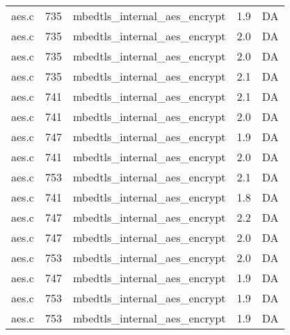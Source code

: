 \begin{table}[h!]
\begin{tabular}{lrlrr}
aes.c& 735&mbedtls\_internal\_aes\_encrypt&1.9 &DA\\
aes.c& 735&mbedtls\_internal\_aes\_encrypt&2.0 &DA\\
aes.c& 735&mbedtls\_internal\_aes\_encrypt&2.0 &DA\\
aes.c& 735&mbedtls\_internal\_aes\_encrypt&2.1 &DA\\
aes.c& 741&mbedtls\_internal\_aes\_encrypt&2.1 &DA\\
aes.c& 741&mbedtls\_internal\_aes\_encrypt&2.0 &DA\\
aes.c& 747&mbedtls\_internal\_aes\_encrypt&1.9 &DA\\
aes.c& 741&mbedtls\_internal\_aes\_encrypt&2.0 &DA\\
aes.c& 753&mbedtls\_internal\_aes\_encrypt&2.1 &DA\\
aes.c& 741&mbedtls\_internal\_aes\_encrypt&1.8 &DA\\
aes.c& 747&mbedtls\_internal\_aes\_encrypt&2.2 &DA\\
aes.c& 747&mbedtls\_internal\_aes\_encrypt&2.0 &DA\\
aes.c& 753&mbedtls\_internal\_aes\_encrypt&2.0 &DA\\
aes.c& 747&mbedtls\_internal\_aes\_encrypt&1.9 &DA\\
aes.c& 753&mbedtls\_internal\_aes\_encrypt&1.9 &DA\\
aes.c& 753&mbedtls\_internal\_aes\_encrypt&1.9 &DA\\
\hline
\end{tabular}
\renewcommand{\baselinestretch}{1.0}\selectfont
\end{table}
